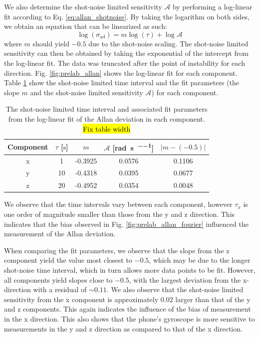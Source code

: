 \documentclass[a4paper]{report}
\numberwithin{equation}{section}
\begin{document}
We also determine the shot-noise limited sensitivity $\mathcal{A}$ 
by performing a log-linear fit according to Eq. \ref{eq:allan_shotnoise}. 
By taking the logarithm on both sides, we obtain an equation that can be linearized as such:
\begin{equation}
	\log(\sigma_{\mathrm{ad}}) = m \log(\tau) + \log \mathcal{A}
\end{equation}
where $m$ should yield $-0.5$ due to the shot-noise scaling. The shot-noise limited sensitivity can then be obtained
by taking the exponential of the intercept from the log-linear fit. The data was truncated after the point of instability for 
each direction. Fig. \ref{fig:prelab_allan} shows the log-linear fit for each component. Table \ref{tab:prelab_allan_vals} show the shot-noise limited time interval and the fit parameters (the slope $m$ and the shot-noise 
limited sensitivity $\mathcal{A}$) for each component. 

\begin{table}[h!]
	\centering
	\begin{tabular}{|c|c|c|c|c|}
		\hline 
		Component & $\tau$ [$\si{\second}$] & $m$ & $\mathcal{A}$ [\si[]{\radian\per\second\per\sqrt{\hertz}}] & $|m - (-0.5)|$\\ \hline
		x & 1 & -0.3925 & 0.0576  & 0.1106\\ \hline
		y & 10 & -0.4318 & 0.0395 & 0.0677\\ \hline
		z & 20 & -0.4952 & 0.0354 & 0.0048\\ \hline
	\end{tabular}
	\caption{The shot-noise limited time interval and associated fit parameters from the log-linear fit of the Allan deviation
			in each component. \hl{Fix table width}}
	\label{tab:prelab_allan_vals}
\end{table}

We observe that the time intervals vary between each component, however $\tau_x$ is one order of magnitude smaller than those from 
the y and z direction. This indicates that the bias observed in Fig. \ref{fig:prelab_allan_fourier} influenced the measurement of the 
Allan deviation. \par 

When comparing the fit parameters, we observe that the slope from the z component yield the value most closest to $-0.5$, which may be 
due to the longer shot-noise time interval, which in turn allows more data points to be fit. However, all components yield slopes
close to $-0.5$, with the largest deviation from the x-direction with a residual of $\sim 0.11$. We also observe that the shot-noise
limited sensitivity from the x component is approximately $0.02$ larger than that of the y and z components. This again 
indicates the influence of the bias of measurement in the x direction. This also shows that the phone's gyroscope is more sensitive
to measurements in the y and z direction as compared to that of the x direction. 
\end{document}
